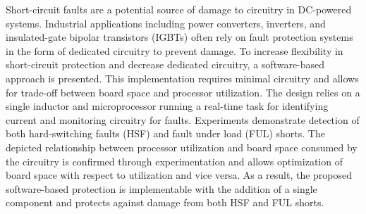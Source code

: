 \documentclass[11pt,oneside]{report}
\begin{document}
    Short-circuit faults are a potential source of damage to circuitry in DC-powered systems. Industrial applications including power converters, inverters, and insulated-gate bipolar transistors (IGBTs) often rely on fault protection systems in the form of dedicated circuitry to prevent damage. To increase flexibility in short-circuit protection and decrease dedicated circuitry, a software-based approach is presented. This implementation requires minimal circuitry and allows for trade-off between board space and processor utilization. The design relies on a single inductor and microprocessor running a real-time task for identifying current and monitoring circuitry for faults. Experiments demonstrate detection of both hard-switching faults (HSF) and fault under load (FUL) shorts. The depicted relationship between processor utilization and board space consumed by the circuitry is confirmed through experimentation and allows optimization of board space with respect to utilization and vice versa. As a result, the proposed software-based protection is implementable with the addition of a single component and protects against damage from both HSF and FUL shorts.
    
\end{document}
